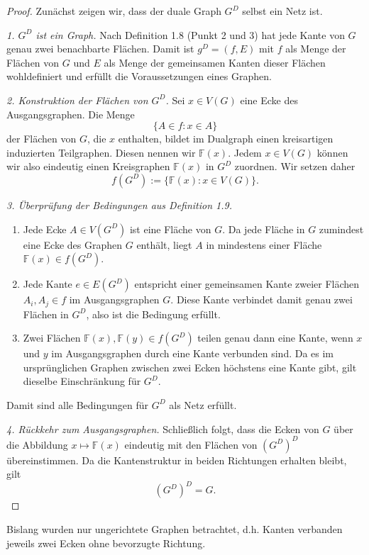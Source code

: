 \documentclass[11pt,a4paper,leqno]{report}
\numberwithin{equation}{chapter}
\begin{document}
\begin{proof}
	Zunächst zeigen wir, dass der duale Graph $G^D$ selbst ein Netz ist.
	
	\smallskip
	\emph{1. $G^D$ ist ein Graph.}  
	Nach Definition 1.8 (Punkt 2 und 3) hat jede Kante von $G$ genau zwei benachbarte Flächen. Damit ist $g^D=(f,E)$ mit $f$ als Menge der Flächen von $G$ und $E$ als Menge der gemeinsamen Kanten dieser Flächen wohldefiniert und erfüllt die Voraussetzungen eines Graphen.
	
	\smallskip
	\emph{2. Konstruktion der Flächen von $G^D$.}  
	Sei $x \in V(G)$ eine Ecke des Ausgangsgraphen. Die Menge 
	$$
	\{A \in f : x \in A\}
	$$ 
	der Flächen von $G$, die $x$ enthalten, bildet im Dualgraph einen kreisartigen induzierten Teilgraphen. Diesen nennen wir $\mathbb{F}(x)$.  
	Jedem $x \in V(G)$ können wir also eindeutig einen Kreisgraphen $\mathbb{F}(x)$ in $G^D$ zuordnen. Wir setzen daher
	$$
	f(G^D) := \{\mathbb{F}(x) : x \in V(G)\}.
	$$
	
	\smallskip
	\emph{3. Überprüfung der Bedingungen aus Definition 1.9.}  
	\begin{enumerate}
		\item Jede Ecke $A \in V(G^D)$ ist eine Fläche von $G$. Da jede Fläche in $G$ zumindest eine Ecke des Graphen $G$ enthält, liegt $A$ in mindestens einer Fläche $\mathbb{F}(x) \in f(G^D)$.
		\item Jede Kante $e \in E(G^D)$ entspricht einer gemeinsamen Kante zweier Flächen $A_i,A_j \in f$ im Ausgangsgraphen $G$. Diese Kante verbindet damit genau zwei Flächen in $G^D$, also ist die Bedingung erfüllt.
		\item Zwei Flächen $\mathbb{F}(x), \mathbb{F}(y) \in f(G^D)$ teilen genau dann eine Kante, wenn $x$ und $y$ im Ausgangsgraphen durch eine Kante verbunden sind. Da es im ursprünglichen Graphen zwischen zwei Ecken höchstens eine Kante gibt, gilt dieselbe Einschränkung für $G^D$.
	\end{enumerate}
	
	Damit sind alle Bedingungen für $G^D$ als Netz erfüllt.
	
	\smallskip
	\emph{4. Rückkehr zum Ausgangsgraphen.}  
	Schließlich folgt, dass die Ecken von $G$ über die Abbildung $x \mapsto \mathbb{F}(x)$ eindeutig mit den Flächen von $(G^D)^D$ übereinstimmen. Da die Kantenstruktur in beiden Richtungen erhalten bleibt, gilt
	$$
	(G^D)^D = G.
	$$
\end{proof}
\noindent
Bislang wurden nur ungerichtete Graphen betrachtet, d.h. Kanten verbanden jeweils zwei Ecken ohne bevorzugte Richtung.\\
\end{document}
